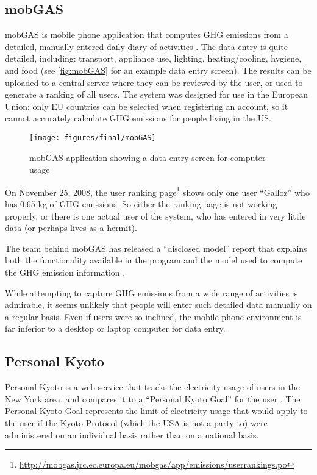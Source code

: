 \subsection{mobGAS}

mobGAS is mobile phone application that computes GHG emissions from a detailed, manually-entered daily diary of activities \cite{mobGAS-website}. The data entry is quite detailed, including: transport, appliance use, lighting, heating/cooling, hygiene, and food (see \autoref{fig:mobGAS} for an example data entry screen). The results can be uploaded to a central server where they can be reviewed by the user, or used to generate a ranking of all users. The system was designed for use in the European Union: only EU countries can be selected when registering an account,  so it cannot accurately calculate GHG emissions for people living in the US.

\begin{figure}[htbp]
	\begin{center}
		\texttt{[image: figures/final/mobGAS]}
		\caption{mobGAS application showing a data entry screen for computer usage}
		\label{fig:mobGAS}
 	\end{center}
\end{figure}

On November 25, 2008, the user ranking page\footnote{\url{http://mobgas.jrc.ec.europa.eu/mobgas/app/emissions/userrankings.po}} shows only one user ``Galloz'' who has 0.65 kg of GHG emissions. So either the ranking page is not working properly, or there is one actual user of the system, who has entered in very little data (or perhaps lives as a hermit).

The team behind mobGAS has released a ``disclosed model'' report that explains both the functionality available in the program and the model used to compute the GHG emission information \cite{Sousa-Pedrosa2008mobGAS-model}.

While attempting to capture GHG emissions from a wide range of activities is admirable, it seems unlikely that people will enter such detailed data manually on a regular basis. Even if users were so inclined, the mobile phone environment is far inferior to a desktop or laptop computer for data entry.

\subsection{Personal Kyoto}
\label{personal-kyoto}

Personal Kyoto is a web service that tracks the electricity usage of users in the New York area, and compares it to a ``Personal Kyoto Goal'' for the user \cite{Personal-Kyoto-website}. The Personal Kyoto Goal represents the limit of electricity usage that would apply to the user if the Kyoto Protocol (which the USA is not a party to) were administered on an individual basis rather than on a national basis.

